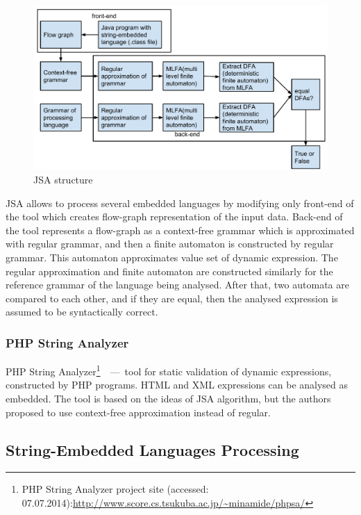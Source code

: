 \documentclass{acm_proc_article-sp}
\begin{document}
\begin{figure}[h!]
    \begin{center}
        \includegraphics[scale=0.35]{graphics/JSA.pdf}
    \end{center}
    \caption{JSA structure}
    \label{jsa_structure}
\end{figure}

JSA allows to process several embedded languages by modifying only front-end of the tool which creates flow-graph representation of the input data. Back-end of the tool represents a flow-graph as a context-free grammar which is approximated with regular grammar, and then a finite automaton is constructed by regular grammar. This automaton approximates value set of dynamic expression. The regular approximation and finite automaton are constructed similarly for the reference grammar of the language being analysed. After that, two automata are compared to each other, and if they are equal, then the analysed expression is assumed to be syntactically correct.  


\subsubsection{PHP String Analyzer}

PHP String Analyzer\footnote{PHP String Analyzer project site (accessed: 07.07.2014):\url{http://www.score.cs.tsukuba.ac.jp/~minamide/phpsa/}}~\cite{Minamide}~---~tool for static validation of dynamic expressions, constructed by PHP programs. HTML and XML expressions can be analysed as embedded. The tool is based on the ideas of JSA algorithm, but the authors proposed to use context-free approximation instead of regular.

\subsection{String-Embedded Languages Processing}
\end{document}
